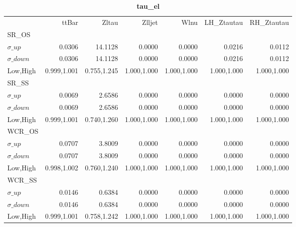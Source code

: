 \documentclass[11pt,oneside,a4paper]{article}
\begin{document}
\begin{table}
\centering
\caption{\bf{tau\_el}}
\begin{tabular}{lrrrrrr}
& ttBar & Zltau & Zlljet & Wlnu & LH\_Ztautau & RH\_Ztautau \\
SR\_OS &  &  &  &  &  &  \\
$\sigma\_up$ & 0.0306 & 14.1128 & 0.0000 & 0.0000 & 0.0216 & 0.0112 \\
$\sigma\_down$ & 0.0306 & 14.1128 & 0.0000 & 0.0000 & 0.0216 & 0.0112 \\
Low,High & 0.999,1.001 & 0.755,1.245 & 1.000,1.000 & 1.000,1.000 & 1.000,1.000 & 1.000,1.000 \\

\hline
SR\_SS &  &  &  &  &  &  \\
$\sigma\_up$ & 0.0069 & 2.6586 & 0.0000 & 0.0000 & 0.0000 & 0.0000 \\
$\sigma\_down$ & 0.0069 & 2.6586 & 0.0000 & 0.0000 & 0.0000 & 0.0000 \\
Low,High & 0.999,1.001 & 0.740,1.260 & 1.000,1.000 & 1.000,1.000 & 1.000,1.000 & 1.000,1.000 \\

\hline
WCR\_OS &  &  &  &  &  &  \\
$\sigma\_up$ & 0.0707 & 3.8009 & 0.0000 & 0.0000 & 0.0000 & 0.0000 \\
$\sigma\_down$ & 0.0707 & 3.8009 & 0.0000 & 0.0000 & 0.0000 & 0.0000 \\
Low,High & 0.998,1.002 & 0.760,1.240 & 1.000,1.000 & 1.000,1.000 & 1.000,1.000 & 1.000,1.000 \\

\hline
WCR\_SS &  &  &  &  &  &  \\
$\sigma\_up$ & 0.0146 & 0.6384 & 0.0000 & 0.0000 & 0.0000 & 0.0000 \\
$\sigma\_down$ & 0.0146 & 0.6384 & 0.0000 & 0.0000 & 0.0000 & 0.0000 \\
Low,High & 0.999,1.001 & 0.758,1.242 & 1.000,1.000 & 1.000,1.000 & 1.000,1.000 & 1.000,1.000 \\

\hline
\end{tabular}
\end{table}
\end{document}
